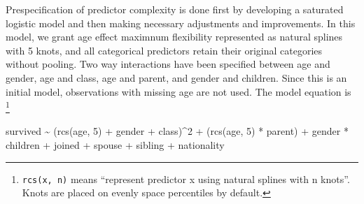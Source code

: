 \documentclass[]{interact}
\theoremstyle{plain}%
\theoremstyle{definition}
\theoremstyle{remark}
\newenvironment{Shaded}{\begin{snugshade}}{\end{snugshade}}
\newcommand{\DecValTok}[1]{\textcolor[rgb]{0.00,0.00,0.81}{#1}}
\newcommand{\FunctionTok}[1]{\textcolor[rgb]{0.00,0.00,0.00}{#1}}
\newcommand{\NormalTok}[1]{#1}
\newcommand{\SpecialCharTok}[1]{\textcolor[rgb]{0.00,0.00,0.00}{#1}}
\begin{document}
Prespecification of predictor complexity is done first by developing a saturated logistic model and then making necessary adjustments and improvements. In this model, we grant age effect maximnum flexibility represented as natural splines with 5 knots, and all categorical predictors retain their original categories without pooling. Two way interactions have been specified between age and gender, age and class, age and parent, and gender and children. Since this is an initial model, observations with missing age are not used. The model equation is \footnote{\texttt{rcs(x,\ n)} means ``represent predictor x using natural splines with n knots''. Knots are placed on evenly space percentiles by default.}

\begin{Shaded}
\begin{Highlighting}[]
\NormalTok{survived }\SpecialCharTok{\textasciitilde{}}\NormalTok{ (}\FunctionTok{rcs}\NormalTok{(age, }\DecValTok{5}\NormalTok{) }\SpecialCharTok{+}\NormalTok{ gender }\SpecialCharTok{+}\NormalTok{ class)}\SpecialCharTok{\^{}}\DecValTok{2} \SpecialCharTok{+}\NormalTok{ (}\FunctionTok{rcs}\NormalTok{(age, }\DecValTok{5}\NormalTok{) }\SpecialCharTok{*}\NormalTok{ parent) }\SpecialCharTok{+} 
\NormalTok{            gender }\SpecialCharTok{*}\NormalTok{ children }\SpecialCharTok{+}\NormalTok{ joined }\SpecialCharTok{+}\NormalTok{ spouse }\SpecialCharTok{+}\NormalTok{ sibling }\SpecialCharTok{+}\NormalTok{ nationality }
\end{Highlighting}
\end{Shaded}
\end{document}
